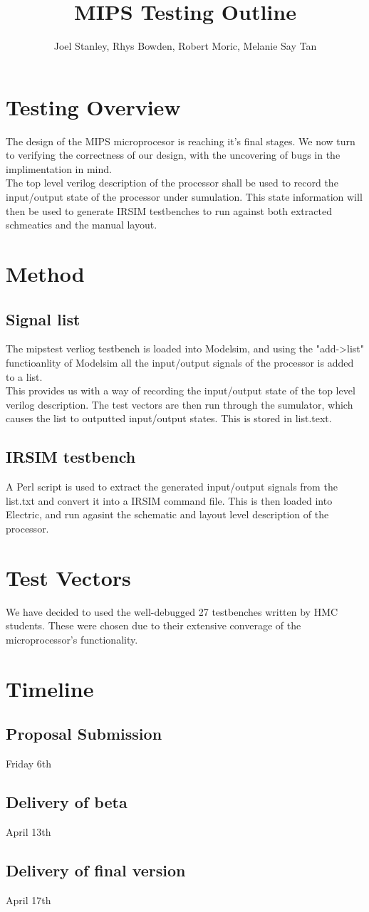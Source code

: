 \documentclass{article}
\begin{document}
\author{Joel Stanley, Rhys Bowden, Robert Moric, Melanie Say Tan}
\title{MIPS Testing Outline}
\maketitle

\section{Testing Overview}
The design of the MIPS microprocesor is reaching it's final stages. We now turn to verifying the correctness of our design, with the uncovering of bugs in the implimentation in mind.
\\The top level verilog description of the processor shall be used to record the input/output state of the processor under sumulation. This state information will then be used to generate IRSIM testbenches to run against both extracted schmeatics and the manual layout.

\section{Method}
\subsection{Signal list}
The mipstest verliog testbench is loaded into Modelsim, and using the
"add->list" functioanlity of Modelsim all the input/output signals of
the processor is added to a list.
\\This provides us with a way of
recording the input/output state of the top level verilog description.
The test vectors are then run through the sumulator, which causes the
list to outputted input/output states. This is stored in list.text.

\subsection{IRSIM testbench}
A Perl script is used to extract the generated input/output signals
from the list.txt and convert it into a IRSIM command file. This is
then loaded into Electric, and run agasint the schematic and layout
level description of the processor.

\section{Test Vectors}
We have decided to used the well-debugged 27 testbenches written by HMC
students. These were chosen due to their extensive converage of the
microprocessor's functionality.

\section{Timeline}
\subsection{Proposal Submission}
Friday 6th

\subsection{Delivery of beta}
April 13th

\subsection{Delivery of final version}
April 17th
\end{document}
